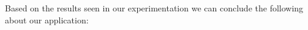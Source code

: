\documentclass[10pt]{article}
\begin{document}


Based on the results seen in our experimentation we can conclude the following about our application:


{}
\end{document}

